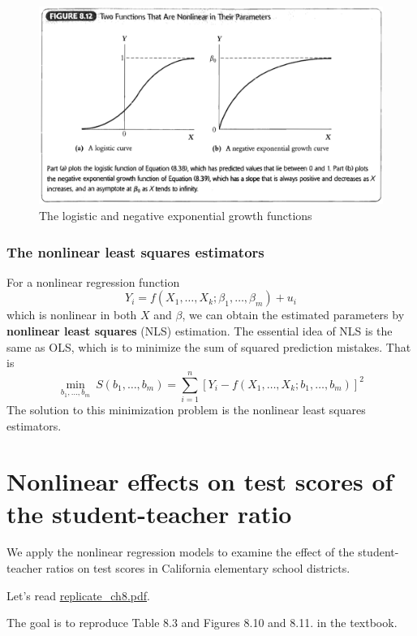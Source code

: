 \documentclass[a4paper,11pt]{article}
\begin{document}
\begin{figure}[htbp]
\centering
\includegraphics[width=.9\linewidth]{img/fig-8-12.png}
\caption{\label{fig:org3231e6f}
The logistic and negative exponential growth functions}
\end{figure}

\subsubsection*{The nonlinear least squares estimators}
\label{sec:org7dfbdcd}
For a nonlinear regression function
\[ Y_i = f(X_1, \ldots, X_k; \beta_1, \ldots, \beta_m) + u_i \]
which is nonlinear in both \(X\) and \(\beta\), we can obtain the
estimated parameters by \textbf{nonlinear least squares} (NLS) estimation. The
essential idea of NLS is the same as OLS, which is to minimize the sum
of squared prediction mistakes. That is
\begin{equation*}
\operatorname*{min}_{b_1, \ldots, b_m}\: S(b_1, \ldots, b_m) = \sum_{i=1}^n \left[ Y_i - f(X_1, \ldots, X_k; b_1, \ldots, b_m) \right]^2
\end{equation*}
The solution to this minimization problem is the nonlinear least
squares estimators.

\section{Nonlinear effects on test scores of the student-teacher ratio}
\label{sec:orgd47ded5}

We apply the nonlinear regression models to examine the effect of
the student-teacher ratios on test scores in California elementary
school districts.

Let's read \href{run:replicate\_ch8/replicate\_ch8.pdf}{replicate\_ch8.pdf}.

The goal is to reproduce Table 8.3 and Figures 8.10 and 8.11. in the
textbook.
\end{document}
